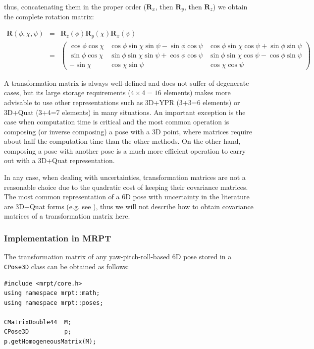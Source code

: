 \documentclass[a4paper,10pt]{report}
\begin{document}
\noindent thus, concatenating them in the proper order ($\mathbf{R}_x$, then $\mathbf{R}_y$, then $\mathbf{R}_z$)
we obtain the complete rotation matrix:

\begin{eqnarray}
\mathbf{R}(\phi,\chi,\psi) &=&  \mathbf{R}_z(\phi) \mathbf{R}_y(\chi) \mathbf{R}_x(\psi) 
\label{eq:mat_ypr} \\
&=& 
\left(
\begin{array}{ccc}
\cos \phi \cos \chi  & \cos \phi \sin \chi \sin \psi - \sin \phi \cos \psi   & \cos \phi \sin \chi \cos \psi + \sin \phi \sin \psi \\
\sin \phi \cos \chi  & \sin \phi \sin \chi \sin \psi + \cos \phi \cos \psi  &  \sin \phi \sin \chi \cos \psi - \cos \phi \sin \psi \\
-\sin \chi & \cos \chi \sin \psi  &  \cos \chi \cos \psi
\end{array}
\right) \nonumber
\end{eqnarray}

A transformation matrix is always well-defined and does not suffer of degenerate cases, but its large
storage requirements ($4\times 4=16$ elements) makes more advisable to use other representations such 
as 3D+YPR (3+3=6 elements) or 3D+Quat (3+4=7 elements) in many situations. 
An important exception is the case when computation time is critical and the most common operation 
is composing (or inverse composing) a pose with a 3D point, where matrices require about half the 
computation time than the other methods. On the other hand, composing a pose with another pose is 
a much more efficient operation to carry out with a 3D+Quat representation. 

In any case, when dealing with uncertainties, transformation matrices are not a 
reasonable choice due to the 
quadratic cost of keeping their covariance matrices. 
The most common representation of a 6D pose with uncertainty in the literature 
are 3D+Quat forms (e.g. see \cite{davison2007mrt}), thus 
we will not describe how to 
obtain covariance matrices of a transformation matrix here.


\subsubsection{Implementation in MRPT}

The transformation matrix of any yaw-pitch-roll-based 6D pose stored in a 
\texttt{CPose3D} class can be obtained as follows:

\begin{lstlisting}
#include <mrpt/core.h> 
using namespace mrpt::math; 
using namespace mrpt::poses; 

CMatrixDouble44  M;
CPose3D          p;
p.getHomogeneousMatrix(M);
\end{lstlisting}
\end{document}
